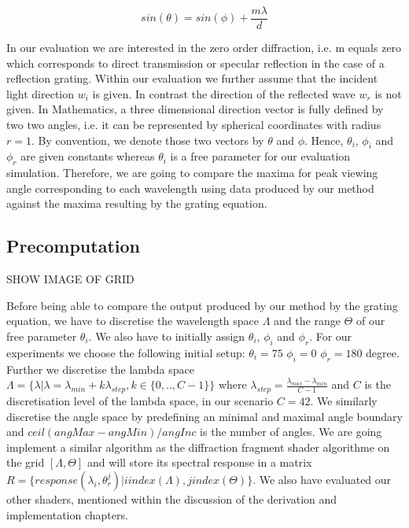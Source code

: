 \begin{equation}
  sin(\theta) = sin(\phi) + \frac{m \lambda}{d}
  \label{eq:gratingEq}
\end{equation}

In our evaluation we are interested in the zero order diffraction, i.e. m equals zero which corresponds to direct transmission or specular reflection in the case of a reflection grating. 
Within our evaluation we further assume that the incident light direction $w_i$ is given. In contrast the direction of the reflected wave $w_r$ is not given.
In Mathematics, a three dimensional direction vector is fully defined by two two angles, i.e. it can be represented by spherical coordinates with radius $r = 1$. By convention, we denote those two vectors by $\theta$ and $\phi$. Hence, $\theta_i$, $\phi_i$ and $\phi_r$ are given constants whereas $\theta_i$ is a free parameter for our evaluation simulation. Therefore, we are going to compare the maxima for peak viewing angle corresponding to each wavelength using data produced by our method against the maxima resulting by the grating equation.

\subsection{Precomputation}
SHOW IMAGE OF GRID

Before being able to compare the output produced by our method by the grating equation, we have to discretise the wavelength space $\Lambda$ and the range $\Theta$ of our free parameter $\theta_i$. We also have to initially assign  $\theta_i$, $\phi_i$ and $\phi_r$. For our experiments we choose the following initial setup: $\theta_i = 75$ $\phi_i = 0$ $\phi_r = 180$ degree.
Further we discretise the lambda space $\Lambda = \{\lambda | \lambda = \lambda_{min} + k\lambda_{step}, k \in \{0,..,C-1\}\}$ where $\lambda_{step} = \frac{\lambda_{max}-\lambda_{min}}{C-1}$ and $C$ is the discretisation level of the lambda space, in our scenario $C = 42$. We similarly discretise the angle space by predefining an minimal and maximal angle boundary and $ceil(angMax - angMin) / angInc$ is the number of angles. 
We are going implement a similar algorithm as the diffraction fragment shader algorithme on the grid $[\Lambda, \Theta]$ and will store its spectral response in a matrix $R = \{response(\lambda_i, \theta_{r}^{j}) | i index(\Lambda), j index(\Theta)\}$. We also have evaluated our other shaders, mentioned within the discussion of the derivation and implementation chapters.

